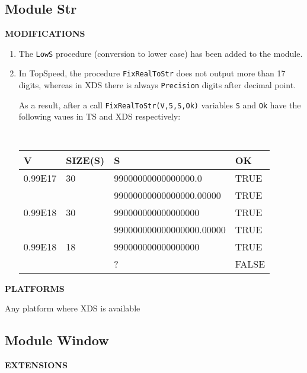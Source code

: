 \subsection{Module Str}

{\bf MODIFICATIONS}

\begin{enumerate}
\item The \verb'LowS' procedure (conversion to lower case) has been added to
      the module.
\item In TopSpeed, the procedure \verb'FixRealToStr' does not output more than 
      17 digits, whereas in XDS there is always \verb'Precision' digits after 
      decimal point.

      As a result, after a call \verb'FixRealToStr(V,5,S,Ok)' variables
      \verb'S' and \verb'Ok' have the following vaues in TS and XDS 
      respectively:

      {\tt
      \begin{tabular}{ll|ll}
      V       & SIZE(S) & S                       & OK \\
      \hline
      0.99E17 & 30      & 99000000000000000.0      & TRUE \\
              &         & 99000000000000000.00000  & TRUE \\
      0.99E18 & 30      & 990000000000000000       & TRUE \\
              &         & 990000000000000000.00000 & TRUE \\
      0.99E18 & 18      & 990000000000000000       & TRUE \\
              &         & ?                        & FALSE \\
      \end{tabular}
      }
   

\end{enumerate}

{\bf PLATFORMS}

  Any platform where XDS is available


\subsection{Module Window}

{\bf EXTENSIONS}


